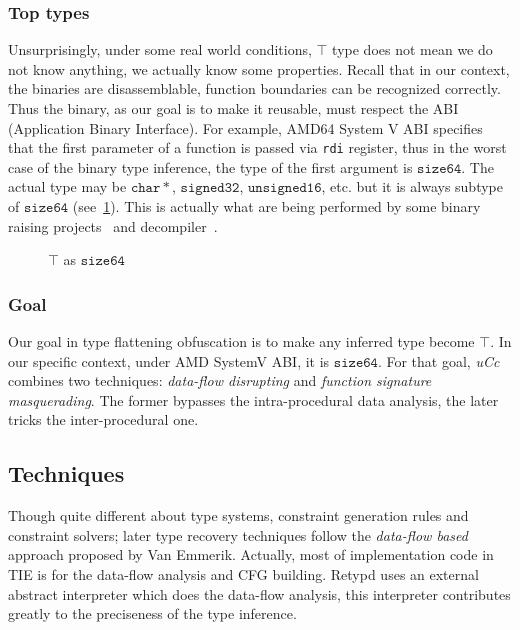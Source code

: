 \documentclass[compsoc,conference,a4paper,10pt,times]{IEEEtran}
\begin{document}
\subsubsection*{Top types}
Unsurprisingly, under some real world conditions, $\top$ type does not mean we do not know anything,
we actually know some properties. Recall that in our context, the binaries are disassemblable, function boundaries can be
recognized correctly.
Thus the binary, as our goal is to make it reusable, must respect the ABI (Application
Binary Interface). For example, AMD64 System V ABI specifies that the first parameter of
a function is passed via \texttt{rdi} register, thus in the worst case of the binary type
inference, the type of the first argument is $\mathtt{size64}$. The actual type may be
$\mathtt{char*}$, $\mathtt{signed32}$, $\mathtt{unsigned16}$, etc. but it is always
subtype of $\mathtt{size64}$ (see~\cref{fig:newtop}). This is actually what are being performed by some binary raising
projects~\cite{goodman_lifting_2018,yadavalli_raising_2019} and decompiler~\cite{durfina_detection_2012}.
\begin{figure}[h]
  \centering
  \caption{$\top$ as $\mathtt{size64}$}
  \label{fig:newtop}
\end{figure}

\subsubsection*{Goal}
Our goal in type flattening obfuscation is to make any inferred type become $\top$. In our specific
context, under AMD SystemV ABI, it is $\mathtt{size64}$. For that goal, \emph{uCc} combines two
techniques: \emph{data-flow disrupting} and \emph{function signature masquerading}. The former
bypasses the intra-procedural data analysis, the later tricks the inter-procedural one.

\subsection{Techniques}
\noindent
Though quite different about type systems, constraint generation rules and constraint solvers;
later type recovery techniques follow the \emph{data-flow based} approach proposed by Van Emmerik.
Actually, most of implementation code in TIE is for the data-flow analysis
and CFG building. Retypd uses an external abstract interpreter
which does the data-flow analysis, this interpreter contributes greatly to the
preciseness of the type inference.
\end{document}
